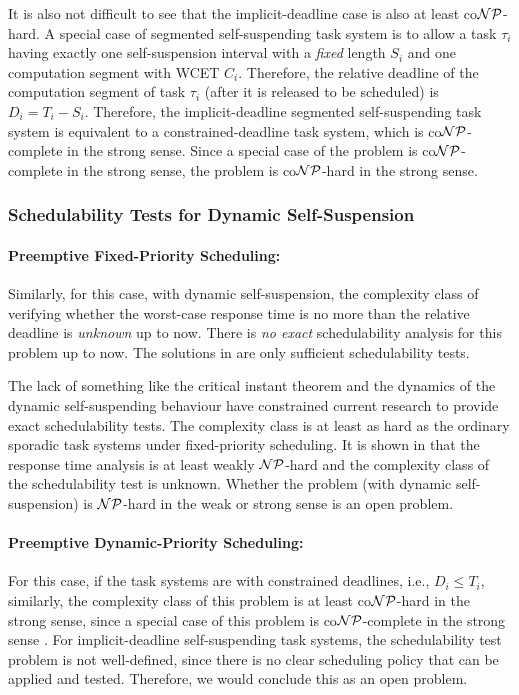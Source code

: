 It is also not difficult to see that the implicit-deadline case is also at least co${\cal NP}$-hard.  A special case of segmented self-suspending task system is to allow a task $\tau_i$ having exactly one self-suspension interval with a \emph{fixed} length $S_i$ and one computation segment with WCET $C_i$. Therefore, the relative deadline of the computation segment of task $\tau_i$ (after it is released to be scheduled) is $D_i = T_i-S_i$. Therefore, the implicit-deadline segmented self-suspending task system is equivalent to a constrained-deadline task system, which is co${\cal NP}$-complete in the strong sense. Since a special case of the problem is co${\cal NP}$-complete in the strong sense, the problem is co${\cal NP}$-hard in the strong sense.


\subsubsection{Schedulability Tests for Dynamic Self-Suspension}
\paragraph{Preemptive Fixed-Priority Scheduling:}   

Similarly, for this case, with dynamic self-suspension, the complexity class of verifying whether the worst-case response time is no more than the relative deadline is \emph{unknown} up to now. There is \emph{no exact} schedulability analysis for this problem up to now. The solutions in \cite{Liu:2000:RS:518501,LiuChen:rtss2014,huangpass:dac2015} are only sufficient schedulability tests. 

The lack of something like the critical instant theorem and the dynamics of the dynamic self-suspending behaviour have constrained current research to provide exact schedulability tests. The complexity class is at least as hard as the ordinary sporadic task systems under fixed-priority scheduling. It is shown in \cite{EisenbrandR08} that the response time analysis is at least weakly ${\cal NP}$-hard and the complexity class of the schedulability test is unknown. Whether the problem (with dynamic self-suspension) is ${\cal NP}$-hard in the weak or strong sense is an open problem.

\paragraph{Preemptive Dynamic-Priority Scheduling:} 
For this case, if the task systems are with constrained deadlines, i.e., $D_i \leq T_i$, similarly, the complexity class of this problem is at least co${\cal NP}$-hard in the strong sense, since a special case of this problem is co${\cal NP}$-complete in the strong sense \cite{DBLP:conf/ecrts/Ekberg015}. For implicit-deadline self-suspending task systems, the schedulability test problem is not well-defined, since there is no clear scheduling policy that can be applied and tested. Therefore, we would conclude this as an open problem.





  